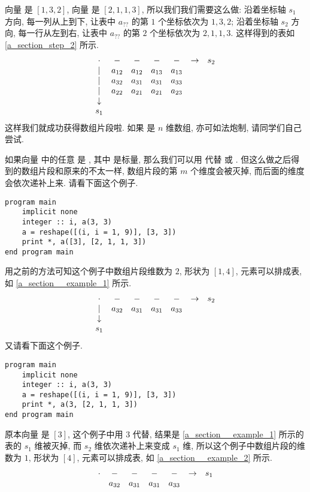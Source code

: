 向量  是 $[1, 3, 2]$, 向量  是 $[2, 1, 1, 3]$, 所以我们我们需要这么做: 沿着坐标轴 $s_1$ 方向, 每一列从上到下, 让表中 $a_{??}$ 的第 $1$ 个坐标依次为 $1, 3, 2$; 沿着坐标轴 $s_2$ 方向, 每一行从左到右, 让表中 $a_{??}$ 的第 $2$ 个坐标依次为 $2, 1, 1, 3$. 这样得到的表如 \eqref{a_section_step_2} 所示.
\begin{equation}
    \begin{matrix}
        \cdot&-&-&-&-&\rightarrow&s_2\\
        |&a_{12}&a_{12}&a_{13}&a_{13}&\\
        |&a_{32}&a_{31}&a_{31}&a_{33}&\\
        |&a_{22}&a_{21}&a_{21}&a_{23}&\\
        \downarrow&&&&&&\\
        s_1&&&&&&
    \end{matrix}\label{a_section_step_2}
\end{equation}
这样我们就成功获得数组片段啦. 如果  是 $n$ 维数组, 亦可如法炮制, 请同学们自己尝试.

如果向量  中的任意  是 \ttt{[im\_{}1]}, 其中 \ttt{[im\_{}1]} 是标量, 那么我们可以用  代替  或 \ttt{[im\_{}1]}. 但这么做之后得到的数组片段和原来的不太一样, 数组片段的第 $m$ 个维度会被灭掉, 而后面的维度会依次递补上来. 请看下面这个例子.
\begin{lstlisting}
program main
    implicit none
    integer :: i, a(3, 3)
    a = reshape([(i, i = 1, 9)], [3, 3])
    print *, a([3], [2, 1, 1, 3])
end program main
\end{lstlisting}
用之前的方法可知这个例子中数组片段维数为 $2$, 形状为 $[1, 4]$, 元素可以排成表, 如 \eqref{a_section__example_1} 所示.
\begin{equation}
    \begin{matrix}
        \cdot&-&-&-&-&\rightarrow&s_2\\
        |&a_{32}&a_{31}&a_{31}&a_{33}&\\
        \downarrow&&&&&&\\
        s_1&&&&&&
    \end{matrix}\label{a_section__example_1}
\end{equation}
又请看下面这个例子.
\begin{lstlisting}
program main
    implicit none
    integer :: i, a(3, 3)
    a = reshape([(i, i = 1, 9)], [3, 3])
    print *, a(3, [2, 1, 1, 3])
end program main
\end{lstlisting}
原本向量  是 $[3]$, 这个例子中用 $3$ 代替, 结果是 \eqref{a_section__example_1} 所示的表的 $s_1$ 维被灭掉, 而 $s_2$ 维依次递补上来变成 $s_1$ 维, 所以这个例子中数组片段的维数为 $1$, 形状为 $[4]$, 元素可以排成表, 如 \eqref{a_section__example_2} 所示.
\begin{equation}
    \begin{matrix}
        \cdot&-&-&-&-&\rightarrow&s_1\\
        &a_{32}&a_{31}&a_{31}&a_{33}&
    \end{matrix}\label{a_section__example_2}
\end{equation}

